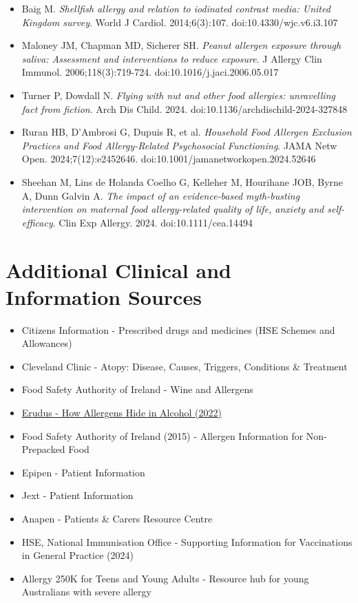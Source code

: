\documentclass[MScCS]{uccthesis}
\begin{document}
\begin{itemize}
    \item Baig M. \textit{Shellfish allergy and relation to iodinated contrast media: United Kingdom survey}. World J Cardiol. 2014;6(3):107. doi:10.4330/wjc.v6.i3.107
    \item Maloney JM, Chapman MD, Sicherer SH. \textit{Peanut allergen exposure through saliva: Assessment and interventions to reduce exposure}. J Allergy Clin Immunol. 2006;118(3):719-724. doi:10.1016/j.jaci.2006.05.017
    \item Turner P, Dowdall N. \textit{Flying with nut and other food allergies: unravelling fact from fiction}. Arch Dis Child. 2024. doi:10.1136/archdischild-2024-327848
    \item Ruran HB, D'Ambrosi G, Dupuis R, et al. \textit{Household Food Allergen Exclusion Practices and Food Allergy-Related Psychosocial Functioning}. JAMA Netw Open. 2024;7(12):e2452646. doi:10.1001/jamanetworkopen.2024.52646
    \item Sheehan M, Lins de Holanda Coelho G, Kelleher M, Hourihane JOB, Byrne A, Dunn Galvin A. \textit{The impact of an evidence-based myth-busting intervention on maternal food allergy-related quality of life, anxiety and self-efficacy}. Clin Exp Allergy. 2024. doi:10.1111/cea.14494
\end{itemize}

\section*{Additional Clinical and Information Sources}
\begin{itemize}
    \item Citizens Information - Prescribed drugs and medicines (HSE Schemes and Allowances)  
    \item Cleveland Clinic - Atopy: Disease, Causes, Triggers, Conditions \& Treatment  
    \item Food Safety Authority of Ireland - Wine and Allergens  
    \item \href{https://erudus.com/editorial/the-food-agenda/how-allergens-hide-in-alcohol}{Erudus - How Allergens Hide in Alcohol (2022)}  
    \item Food Safety Authority of Ireland (2015) - Allergen Information for Non-Prepacked Food  
    \item Epipen - Patient Information  
    \item Jext - Patient Information  
    \item Anapen - Patients \& Carers Resource Centre  
    \item HSE, National Immunisation Office - Supporting Information for Vaccinations in General Practice (2024)  
    \item Allergy 250K for Teens and Young Adults - Resource hub for young Australians with severe allergy  
\end{itemize}


\printbibliography
\end{document}

